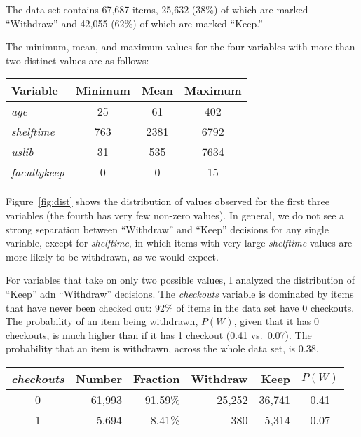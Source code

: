 \documentclass[man,11pt]{apa6}
\begin{document}
The data set contains 67,687 items, 25,632 (38\%) of which are marked
``Withdraw'' and 42,055 (62\%) of which are marked ``Keep.''  

The minimum, mean, and maximum values for the four variables with more
than two distinct values are as follows:

\singlespacing
\begin{center}
\begin{tabular}{|l|ccc|}
\hline
Variable & Minimum & Mean & Maximum \\
\hline
 {\em age} & 25 & 61 & 402 \\
 {\em shelftime} & 763 & 2381 & 6792 \\
 {\em uslib} & 31 & 535 & 7634  \\
 {\em facultykeep} & 0 & 0 & 15 \\
\hline
\end{tabular}
\end{center}
\doublespacing


Figure~\ref{fig:dist} shows the distribution of values observed for
the first three variables (the fourth has very few non-zero values).
In general, we do not see a strong separation between ``Withdraw'' and
``Keep'' decisions for any single variable, except for {\em
  shelftime}, in which items with very large {\em shelftime} values
are more likely to be withdrawn, as we would expect.

For variables that take on only two possible values, I analyzed the
distribution of ``Keep'' adn ``Withdraw'' decisions.
%
The {\em checkouts} variable is dominated by items that have never
been checked out: 92\% of items in the data set have 0 checkouts.
The probability of an item being withdrawn, $P(W)$, given that it has
0 checkouts, is much higher than if it has 1 checkout (0.41 vs.~0.07).
The probability that an item is withdrawn, across the whole data set,
is 0.38. 

\singlespacing
\begin{center}
\begin{tabular}{|c|rr|rr|c|}
\hline
{\em checkouts} & Number & Fraction & Withdraw & Keep & $P(W)$\\ \hline
0 & 61,993 & 91.59\% & 25,252 & 36,741 & 0.41 \\
1 &  5,694 &  8.41\% &    380 &  5,314 & 0.07 \\
\hline
\end{tabular}
\end{center}
\doublespacing
\end{document}
